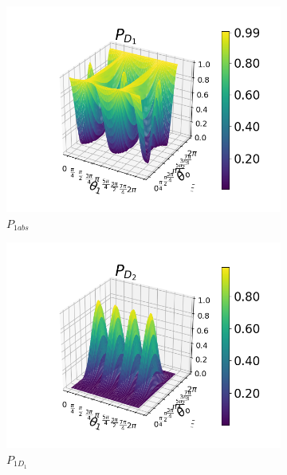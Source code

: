 \documentclass[12pt]{book}
\begin{document}
\begin{figure}[t]
\centering
\begin{subfigure}[b]{0.45\linewidth}
\includegraphics[width=\linewidth]{images/PD1_BS_h.png}
\caption{$P_{1abs}$}
\label{fig:BS1}
\end{subfigure}
\begin{subfigure}[b]{0.45\linewidth}
\includegraphics[width=\linewidth]{images/PD2_BS_h.png}
\caption{$P_{1D_{1}}$}
\label{fig:westminster_aerea}
\end{subfigure}
\begin{subfigure}[b]{0.45\linewidth}

\end{subfigure}
\end{figure}
\end{document}
